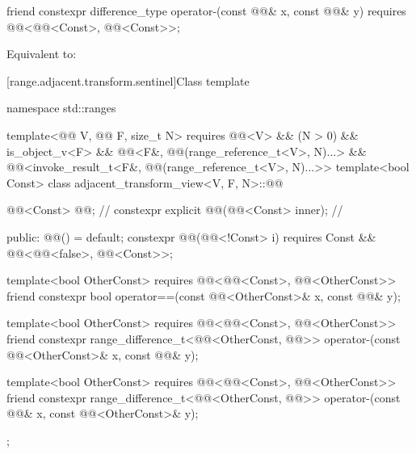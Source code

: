 \begin{itemdecl}
friend constexpr difference_type operator-(const @@& x, const @@& y)
  requires @@<@@<Const>, @@<Const>>;
\end{itemdecl}

\begin{itemdescr}
\pnum
\effects
Equivalent to: 
\end{itemdescr}

[range.adjacent.transform.sentinel]{Class template }

%
\begin{codeblock}
namespace std::ranges {
  template<@@ V, @@ F, size_t N>
    requires @@<V> && (N > 0) && is_object_v<F> &&
             @@<F&, @@(range_reference_t<V>, N)...> &&
             @@<invoke_result_t<F&, @@(range_reference_t<V>, N)...>>
  template<bool Const>
  class adjacent_transform_view<V, F, N>::@@ {
    @@<Const> @@;                               // \expos
    constexpr explicit @@(@@<Const> inner);   // \expos

  public:
    @@() = default;
    constexpr @@(@@<!Const> i)
      requires Const && @@<@@<false>, @@<Const>>;

    template<bool OtherConst>
      requires @@<@@<Const>, @@<OtherConst>>
    friend constexpr bool operator==(const @@<OtherConst>& x, const @@& y);

    template<bool OtherConst>
      requires @@<@@<Const>, @@<OtherConst>>
    friend constexpr range_difference_t<@@<OtherConst, @@>>
      operator-(const @@<OtherConst>& x, const @@& y);

    template<bool OtherConst>
      requires @@<@@<Const>, @@<OtherConst>>
    friend constexpr range_difference_t<@@<OtherConst, @@>>
      operator-(const @@& x, const @@<OtherConst>& y);
  };
}
\end{codeblock}

